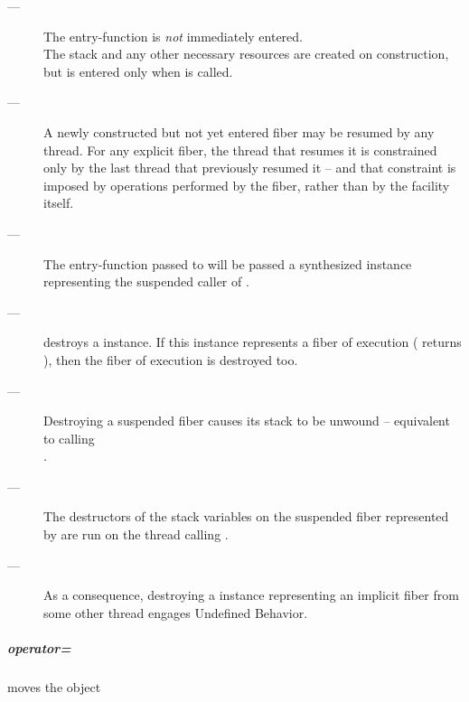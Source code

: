 \remarks
\begin{description}
    \item[---] The entry-function  is \emph{not} immediately entered.\\
              The stack and any other necessary resources are created
              on construction, but  is entered
              only when \allresume is called.
    \item[---] A newly constructed but not yet entered fiber may be resumed by
              any thread. For any explicit fiber, the thread that resumes it
              is constrained only by the last thread that previously resumed
              it -- and that constraint is imposed by operations performed by
              the fiber, rather than by the \fiber facility itself.
    \item[---] The entry-function  passed to \fiber
              will be passed a synthesized \fiber instance representing the
              suspended caller of \allresume.
\end{description}


\effects
\begin{description}
    \item[---] destroys a \fiber instance. If this instance represents a fiber
              of execution ( returns ), then the fiber of
              execution is destroyed too.
\end{description}

\remarks
\begin{description}
    \item[---] Destroying a suspended fiber causes its stack to be unwound --
               equivalent to calling\\
               .
    \item[---] The destructors of the stack variables on the suspended fiber
               represented by 
               are run on the thread calling \dtor.
    \item[---] As a consequence, destroying a \fiber instance
               representing an implicit fiber from some other
               thread engages Undefined Behavior.
\end{description}

\subparagraph*{operator=}
moves the \fiber object

